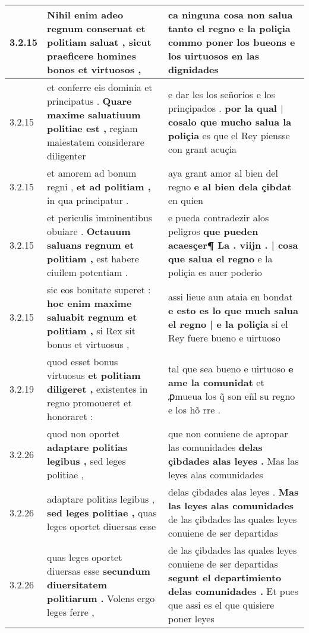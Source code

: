 \begin{tabular}{|p{1cm}|p{6.5cm}|p{6.5cm}|}
3.2.15 & Nihil enim adeo regnum conseruat \textbf{ et politiam saluat , } sicut praeficere homines bonos et virtuosos , & ca ninguna cosa non salua tanto el regno \textbf{ e la poliçia } commo poner los bueons e los uirtuosos en las dignidades \\\hline
3.2.15 & et conferre eis dominia et principatus . \textbf{ Quare maxime saluatiuum politiae est , } regiam maiestatem considerare diligenter & e dar les los señorios e los prinçipados . \textbf{ por la qual | cosalo que mucho salua la poliçia } es que el Rey piensse con grant acuçia \\\hline
3.2.15 & et amorem ad bonum regni , \textbf{ et ad politiam , } in qua principatur . & aya grant amor al bien del regno \textbf{ e al bien dela çibdat } en quien \\\hline
3.2.15 & et periculis imminentibus obuiare . \textbf{ Octauum saluans regnum et politiam , } est habere ciuilem potentiam . & e pueda contradezir alos peligros \textbf{ que pueden acaesçer¶ La . viijn . | cosa que salua el regno } e la poliçia es auer poderio \\\hline
3.2.15 & sic eos bonitate superet : \textbf{ hoc enim maxime saluabit regnum et politiam , } si Rex sit bonus et virtuosus , & assi lieue aun ataia en bondat \textbf{ e esto es lo que much salua el regno | e la poliçia } si el Rey fuere bueno e uirtuoso \\\hline
3.2.19 & quod esset bonus virtuosus \textbf{ et politiam diligeret , } existentes in regno promoueret et honoraret : & tal que sea bueno e uirtuoso \textbf{ e ame la comunidat } et ꝓmueua los q̃ son eñl su regno e los hõ rre . \\\hline
3.2.26 & quod non oportet \textbf{ adaptare politias legibus , } sed leges politiae , & que non conuiene de apropar las comunidades \textbf{ delas çibdades alas leyes . } Mas las leyes alas comunidades \\\hline
3.2.26 & adaptare politias legibus , \textbf{ sed leges politiae , } quas leges oportet diuersas esse & delas çibdades alas leyes . \textbf{ Mas las leyes alas comunidades } de las çibdades las quales leyes conuiene de ser departidas \\\hline
3.2.26 & quas leges oportet diuersas esse \textbf{ secundum diuersitatem politiarum . } Volens ergo leges ferre , & de las çibdades las quales leyes conuiene de ser departidas \textbf{ segunt el departimiento delas comunidades . } Et pues que assi es el que quisiere poner leyes \\\hline

\end{tabular}
